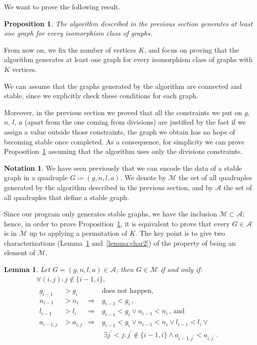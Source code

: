 \documentclass{amsart}
\theoremstyle{plain}
\newtheorem{proposition}[theorem]{Proposition}
\newtheorem{lemma}[theorem]{Lemma}
\theoremstyle{definition}
\newtheorem{notation}[theorem]{Notation}
\newcommand{\ubar}[1]{\underline{#1}}
\begin{document}
We want to prove the following result.

\begin{proposition}\label{prop:main}
  The algorithm described in the previous section generates at least
  one graph for every isomorphism class of graphs.
\end{proposition}

From now on, we fix the number of vertices $K$, and focus on proving
that the algorithm generates at least one graph for every isomorphism
class of graphs with $K$ vertices.

We can assume that the graphs generated by the algorithm are connected
and stable, since we explicitly check these conditions for each graph.

Moreover, in the previous section we proved that all the constraints
we put on $g$, $n$, $l$, $a$ (apart from the one coming from
divisions) are justified by the fact if we assign a value outside
those constraints, the graph we obtain has no hope of becoming stable
once completed. As a consequence, for simplicity we can prove
Proposition~\ref{prop:main} assuming that the algorithm uses only the
divisions constraints.

\begin{notation}
  We have seen previously that we can encode the data of a stable
  graph in a quadruple $G \coloneqq (g, n, l, a)$. We denote by
  $\mathcal{M}$ the set of all quadruples generated by the algorithm
  described in the previous section, and by $\mathcal{A}$ the set of
  all quadruples that define a stable graph.
\end{notation}

Since our program only generates stable graphs, we have
the inclusion $\mathcal{M} \subset \mathcal{A}$; hence, in order to prove
Proposition~\ref{prop:main}, it is equivalent to prove that every $G \in
\mathcal{A}$ is in $\mathcal{M}$ up to applying a permutation of
$\ubar{K}$. The key point is to give two characterizations
(Lemma~\ref{lemma:char1} and~\ref{lemma:char2}) of the property of
being an element of $\mathcal{M}$.

\begin{lemma}\label{lemma:char1}
  Let $G = (g, n, l, a) \in \mathcal{A}$; then $G \in \mathcal{M}$ if
  and only if:
  \begin{multline*}
    \forall (i,j)\colon
    j \not\in \{i-1, i\},\\
    \begin{aligned}
      g_{i-1} &> g_i &&\text{does not happen,}\\
      n_{i-1} &> n_i &\Rightarrow\  & g_{i-1} < g_i\,\text{,}\\
      l_{i-1} &> l_i &\Rightarrow\  & g_{i-1} < g_i \vee n_{i-1} < n_i\,\text{, and}\\
      a_{i-1,j} &> a_{i,j} &\Rightarrow\ & g_{i-1} < g_i \vee n_{i-1}
      < n_i \vee l_{i-1} < l_i \vee\\
      &&&\ \exists j^\prime < j: j^\prime \not\in \{i-1,i\} \wedge
      a_{i-1,j^\prime} < a_{i,j^\prime}\,\text{.}
    \end{aligned}
  \end{multline*}
\end{lemma}
\end{document}
